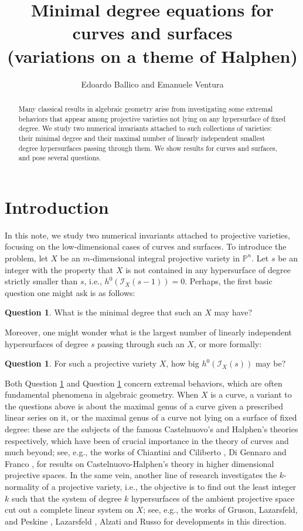 \documentclass[a4, 11pt]{amsart}
\date{}
\title[Minimal degree equations for curves and surfaces]{Minimal degree equations for curves and surfaces \\ (variations on a theme of Halphen)}
\author{Edoardo Ballico and Emanuele Ventura}
\theoremstyle{plain}
\theoremstyle{definition}
\newtheorem{question}[theorem]{Question}
\begin{document}
\maketitle

\begin{abstract}
Many classical results in algebraic geometry arise from investigating some extremal behaviors that appear
among projective varieties not lying on any hypersurface of fixed degree. We study two numerical invariants attached to such collections of varieties: their minimal degree and their maximal number of linearly independent smallest degree hypersurfaces passing through them. We show results for curves and surfaces, and pose several questions. 
\end{abstract}


\section{Introduction}\label{intro}


\noindent In this note, we study two numerical invariants attached to projective varieties, focusing on the low-dimensional cases of curves and surfaces. To introduce the problem, let $X$ be an $m$-dimensional integral projective variety in $\mathbb P^n$. Let $s$ be an integer with the property that $X$ is not contained in any hypersurface of degree strictly smaller than $s$, i.e., $h^0(\mathcal I_X(s-1))=0$.  Perhaps, the first basic question one might ask is as follows: 

\begin{question}\label{mindeg}
What is the minimal degree that such an $X$ may have?
\end{question}

Moreover, one might wonder what is the largest number of linearly independent hypersurfaces of degree $s$ passing through such an $X$, or more formally:

\begin{question}\label{maxnumb}
For such a projective variety $X$, how big $h^0(\mathcal I_X(s))$ may be?
\end{question}

Both Question \ref{mindeg} and Question \ref{maxnumb} concern extremal behaviors, which are often fundamental phenomena in algebraic geometry. When $X$ is a curve, a variant to the questions above is about the maximal genus of a curve given a prescribed linear series on it, or the maximal genus of a curve not lying on a surface of fixed degree: these are the subjects of the famous Castelnuovo's and Halphen's theories respectively, which have been of crucial importance in the theory of curves and much beyond; see, e.g., the works of Chiantini and Ciliberto \cite{cc}, Di Gennaro and Franco \cite{df}, for results on Castelnuovo-Halphen's theory in higher dimensional projective spaces. In the same vein, another line of research investigates the $k$-normality of a projective variety, i.e., the objective is to find out the least integer $k$ such that the system of degree $k$ hypersurfaces of the ambient projective space cut out a complete linear system on $X$; see, e.g., the works of Gruson, Lazarsfeld, and Peskine \cite{glp}, Lazarsfeld \cite{laz87}, Alzati and Russo \cite{ar} for developments in this direction. 
\end{document}
